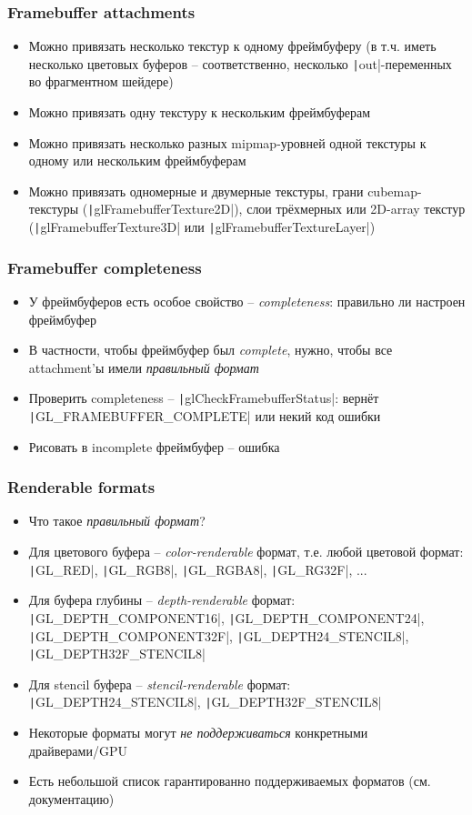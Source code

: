 \documentclass[10pt]{beamer}
\begin{document}
\begin{frame}[fragile]
\frametitle{Framebuffer attachments}
\begin{itemize}
\item Можно привязать несколько текстур к одному фреймбуферу (в т.ч. иметь несколько цветовых буферов -- соответственно, несколько \texttt|out|-переменных во фрагментном шейдере)
\pause
\item Можно привязать одну текстуру к нескольким фреймбуферам
\pause
\item Можно привязать несколько разных mipmap-уровней одной текстуры к одному или нескольким фреймбуферам
\pause
\item Можно привязать одномерные и двумерные текстуры, грани cubemap-текстуры (\texttt|glFramebufferTexture2D|), слои трёхмерных или 2D-array текстур (\texttt|glFramebufferTexture3D| или \texttt|glFramebufferTextureLayer|)
\end{itemize}
\end{frame}

\begin{frame}[fragile]
\frametitle{Framebuffer completeness}
\begin{itemize}
\item У фреймбуферов есть особое свойство -- \textit{completeness}: правильно ли настроен фреймбуфер
\pause
\item В частности, чтобы фреймбуфер был \textit{complete}, нужно, чтобы все attachment'ы имели \textit{правильный формат}
\pause
\item Проверить completeness -- \texttt|glCheckFramebufferStatus|: вернёт \texttt|GL_FRAMEBUFFER_COMPLETE| или некий код ошибки
\pause
\item Рисовать в incomplete фреймбуфер -- ошибка
\end{itemize}
\end{frame}

\begin{frame}[fragile]
\frametitle{Renderable formats}
\begin{itemize}
\item Что такое \textit{правильный формат}?
\pause
\item Для цветового буфера -- \textit{color-renderable} формат, т.е. любой цветовой формат: \texttt|GL_RED|, \texttt|GL_RGB8|, \texttt|GL_RGBA8|, \texttt|GL_RG32F|, ...
\pause
\item Для буфера глубины -- \textit{depth-renderable} формат: \texttt|GL_DEPTH_COMPONENT16|, \texttt|GL_DEPTH_COMPONENT24|, \texttt|GL_DEPTH_COMPONENT32F|, \texttt|GL_DEPTH24_STENCIL8|, \texttt|GL_DEPTH32F_STENCIL8|
\pause
\item Для stencil буфера -- \textit{stencil-renderable} формат: \texttt|GL_DEPTH24_STENCIL8|, \texttt|GL_DEPTH32F_STENCIL8|
\pause
\item Некоторые форматы могут \textit{не поддерживаться} конкретными драйверами/GPU
\pause
\item Есть небольшой список гарантированно поддерживаемых форматов (см. документацию)
\end{itemize}
\end{frame}
\end{document}
